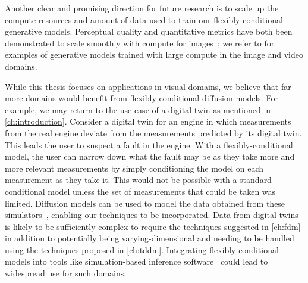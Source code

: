 Another clear and promising direction for future research is to scale up the compute resources and amount of data used to train our flexibly-conditional generative models. Perceptual quality and quantitative metrics have both been demonstrated to scale smoothly with compute for images~\citep{peebles2022scalable}; we refer to \citet{esser2024scaling,brooks2024video} for examples of generative models trained with large compute in the image and video domains.

While this thesis focuses on applications in visual domains, we believe that far more domains would benefit from flexibly-conditional diffusion models. For example, we may return to the use-case of a digital twin as mentioned in \cref{ch:introduction}. Consider a digital twin for an engine in which measurements from the real engine deviate from the measurements predicted by its digital twin. This leads the user to suspect a fault in the engine. With a flexibly-conditional model, the user can narrow down what the fault may be as they take more and more relevant measurements by simply conditioning the model on each measurement as they take it. This would not be possible with a standard conditional model unless the set of measurements that could be taken was limited. Diffusion models can be used to model the data obtained from these simulators~\citep{weilbach2023graphically,gloeckler2024all}, enabling our techniques to be incorporated. Data from digital twins is likely to be sufficiently complex to require the techniques suggested in \cref{ch:fdm} in addition to potentially being varying-dimensional and needing to be handled using the techniques proposed in \cref{ch:tddm}. Integrating flexibly-conditional models into tools like simulation-based inference software~\citep{gloeckler2024all} could lead to widespread use for such domains.

